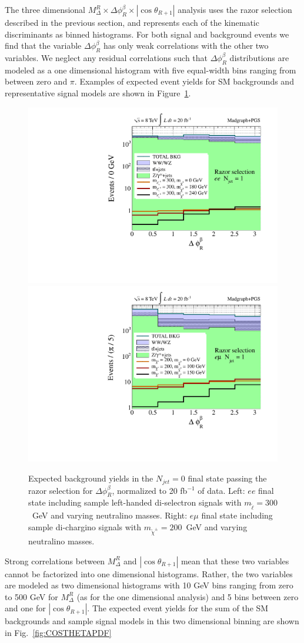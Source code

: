 The three dimensional $M_{\Delta}^{R} \times \Delta\phi_{R}^{\beta} \times |\cos\theta_{R+1}|$ analysis uses the razor selection described in the previous section, and represents each of the kinematic discriminants as binned histograms. For both signal and background events we find that the variable $\Delta\phi_{R}^{\beta}$ has only weak correlations with the other two variables. We neglect any residual correlations such that $\Delta\phi_{R}^{\beta}$ distributions are modeled as a one dimensional histogram with five equal-width bins ranging from between zero and $\pi$. Examples of expected event yields for SM backgrounds and representative signal models are shown in Figure~\ref{fig:DPHIPDF}.

\begin{figure}[ht]
\includegraphics[width=0.35\columnwidth]{fig/sectionIV/PDF_selectronL_Razor_DPHI_ee_Njet1.pdf}
\includegraphics[width=0.35\columnwidth]{fig/sectionIV/PDF_chargino_Razor_DPHI_OF_Njet1.pdf}
\caption{Expected background yields in the $N_{jet} = 0$ final state passing the razor selection for $\Delta\phi_{R}^{\beta}$, normalized to 20 fb$^{-1}$ of data. Left: $ee$ final state including sample left-handed di-selectron signals with $m_{\tilde{\ell}} = 300$~GeV and varying neutralino masses. Right: $e\mu$ final state including sample di-chargino signals with $m_{\tilde{\chi}^{\pm}} = 200$~GeV and varying neutralino masses. \label{fig:DPHIPDF}}
\end{figure}

Strong correlations between $M_{\Delta}^{R}$ and $|\cos\theta_{R+1}|$ mean that these two variables cannot be factorized into one dimensional histograms. Rather, the two variables are modeled as two dimensional histograms with 10 GeV bins ranging from zero to 500 GeV for $M_{\Delta}^{R}$ (as for the one dimensional analysis) and 5 bins between zero and one for $|\cos\theta_{R+1}|$. The expected event yields for the sum of the SM backgrounds and sample signal models in this two dimensional binning are shown in Fig.~\ref{fig:COSTHETAPDF}

